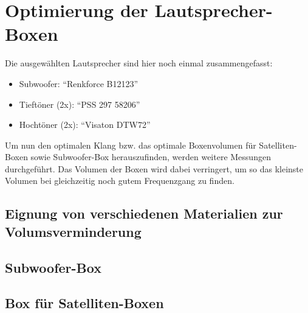 \newpage
\section{Optimierung der Lautsprecher-Boxen}\label{sec:4.4}
Die ausgewählten Lautsprecher sind hier noch einmal zusammengefasst:
\begin{itemize}
	\item Subwoofer: \enquote{Renkforce B12123}
	\item Tieftöner (2x): \enquote{PSS 297 58206}
	\item Hochtöner (2x): \enquote{Visaton DTW72}
\end{itemize}
Um nun den optimalen Klang bzw. das optimale Boxenvolumen für Satelliten-Boxen sowie Subwoofer-Box herauszufinden, werden weitere Messungen durchgeführt.
Das Volumen der Boxen wird dabei verringert, um so das kleinste Volumen bei gleichzeitig noch gutem Frequenzgang zu finden.

\subsection{Eignung von verschiedenen Materialien zur Volumsverminderung}\label{subsec:4.4.1}


\subsection{Subwoofer-Box}\label{subsec:4.4.2}


\subsection{Box für Satelliten-Boxen}\label{subsec:4.4.3}